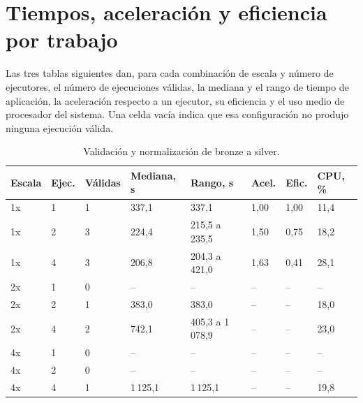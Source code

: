 \section{Tiempos, aceleración y eficiencia por trabajo}
\label{sec:anexo_benchmark_tiempos}

Las tres tablas siguientes dan, para cada combinación de escala y número de
ejecutores, el número de ejecuciones válidas, la mediana y el rango de
tiempo de aplicación, la aceleración respecto a un ejecutor, su eficiencia
y el uso medio de procesador del sistema. Una celda vacía indica que esa
configuración no produjo ninguna ejecución válida.

\begin{table}[H]
  \centering
  \footnotesize
  \setlength{\tabcolsep}{4pt}
  \renewcommand{\arraystretch}{1.05}
  \begin{tabular}{p{} p{} p{} p{} p{} p{} p{} p{}}
    \hline
    \textbf{Escala} & \textbf{Ejec.} & \textbf{Válidas} & \textbf{Mediana, s} & \textbf{Rango, s} & \textbf{Acel.} & \textbf{Efic.} & \textbf{CPU, \%} \\
    \hline
    1x & 1 & 1 & 337,1 & 337,1 & 1,00 & 1,00 & 11,4 \\
    1x & 2 & 3 & 224,4 & 215,5 a 235,5 & 1,50 & 0,75 & 18,2 \\
    1x & 4 & 3 & 206,8 & 204,3 a 421,0 & 1,63 & 0,41 & 28,1 \\
    2x & 1 & 0 & -- & -- & -- & -- & -- \\
    2x & 2 & 1 & 383,0 & 383,0 & -- & -- & 18,0 \\
    2x & 4 & 2 & 742,1 & 405,3 a 1\,078,9 & -- & -- & 23,0 \\
    4x & 1 & 0 & -- & -- & -- & -- & -- \\
    4x & 2 & 0 & -- & -- & -- & -- & -- \\
    4x & 4 & 1 & 1\,125,1 & 1\,125,1 & -- & -- & 19,8 \\
    \hline
  \end{tabular}
  \caption{Validación y normalización de bronze a silver.}
  \label{tab:anexo_benchmark_silver}
\end{table}

